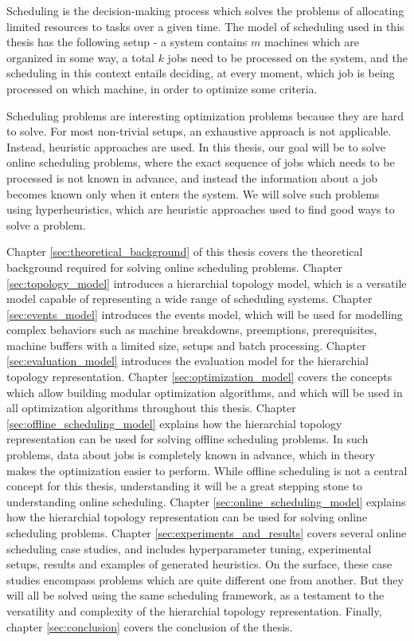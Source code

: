 Scheduling is the decision-making process which solves the problems of allocating limited resources to tasks over a given time. The model of scheduling used in this thesis has the following setup - a system contains $m$ machines which are organized in some way, a total $k$ jobs need to be processed on the system, and the scheduling in this context entails deciding, at every moment, which job is being processed on which machine, in order to optimize some criteria. 

Scheduling problems are interesting optimization problems because they are hard to solve. For most non-trivial setups, an exhaustive approach is not applicable. Instead, heuristic approaches are used. In this thesis, our goal will be to solve online scheduling problems, where the exact sequence of jobs which needs to be processed is not known in advance, and instead the information about a job becomes known only when it enters the system. We will solve such problems using hyperheuristics, which are heuristic approaches used to find good ways to solve a problem.

Chapter \ref{sec:theoretical_background} of this thesis covers the theoretical background required for solving online scheduling problems. Chapter \ref{sec:topology_model} introduces a hierarchial topology model, which is a versatile model capable of representing a wide range of scheduling systems. Chapter \ref{sec:events_model} introduces the events model, which will be used for modelling complex behaviors such as machine breakdowns, preemptions, prerequisites, machine buffers with a limited size, setups and batch processing. Chapter \ref{sec:evaluation_model} introduces the evaluation model for the hierarchial topology representation. Chapter \ref{sec:optimization_model} covers the concepts which allow building modular optimization algorithms, and which will be used in all optimization algorithms throughout this thesis. Chapter \ref{sec:offline_scheduling_model} explains how the hierarchial topology representation can be used for solving offline scheduling problems. In such problems, data about jobs is completely known in advance, which in theory makes the optimization easier to perform. While offline scheduling is not a central concept for this thesis, understanding it will be a great stepping stone to understanding online scheduling. Chapter \ref{sec:online_scheduling_model} explains how the hierarchial topology representation can be used for solving online scheduling problems. Chapter \ref{sec:experiments_and_results} covers several online scheduling case studies, and includes hyperparameter tuning, experimental setups, results and examples of generated heuristics. On the surface, these case studies encompass problems which are quite different one from another. But they will all be solved using the same scheduling framework, as a testament to the versatility and complexity of the hierarchial topology representation. Finally, chapter \ref{sec:conclusion} covers the conclusion of the thesis.